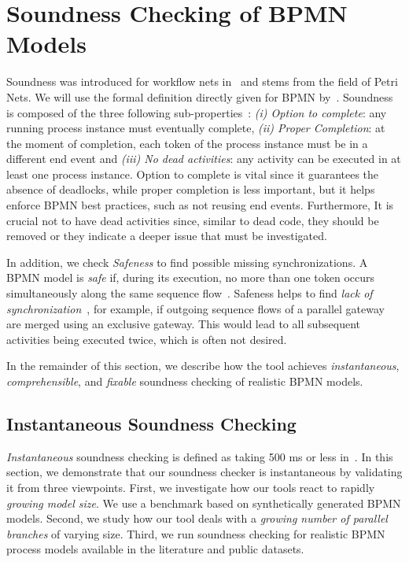 \documentclass[runningheads]{llncs}
\begin{document}
\section{Soundness Checking of BPMN Models} \label{sec:soundness}

Soundness was introduced for workflow nets in~\cite{vanderaalstApplicationPetriNets1998} and stems from the field of Petri Nets.
We will use the formal definition directly given for BPMN by~\cite{corradiniClassificationBPMNCollaborations2018}.
Soundness is composed of the three following sub-properties~\cite{corradiniClassificationBPMNCollaborations2018}:
\textit{(i) Option to complete}: any running process instance must eventually complete,
\textit{(ii) Proper Completion}: at the moment of completion, each token of the process instance must be in a different end event and
\textit{(iii) No dead activities}: any activity can be executed in at least one process instance.
Option to complete is vital since it guarantees the absence of deadlocks, while proper completion is less important, but it helps enforce BPMN best practices, such as not reusing end events.
Furthermore, It is crucial not to have dead activities since, similar to dead code, they should be removed or they indicate a deeper issue that must be investigated.

In addition, we check \textit{Safeness} to find possible missing synchronizations.
A BPMN model is \textit{safe} if, during its execution, no more than one token occurs simultaneously along the same sequence flow~\cite{corradiniClassificationBPMNCollaborations2018}.
Safeness helps to find \textit{lack of synchronization}~\cite{fahlandAnalysisDemandInstantaneous2011}, for example, if outgoing sequence flows of a parallel gateway are merged using an exclusive gateway.
This would lead to all subsequent activities being executed twice, which is often not desired.

In the remainder of this section, we describe how the tool achieves \textit{instantaneous}, \textit{comprehensible}, and \textit{fixable} soundness checking of realistic BPMN models.


\subsection{Instantaneous Soundness Checking} \label{subsec:instantaneous}
\textit{Instantaneous} soundness checking is defined as taking 500 ms or less in~\cite{fahlandAnalysisDemandInstantaneous2011}.
In this section, we demonstrate that our soundness checker is instantaneous by validating it from three viewpoints.
First, we investigate how our tools react to rapidly \textit{growing model size}.
We use a benchmark based on synthetically generated BPMN models.
Second, we study how our tool deals with a \textit{growing number of parallel branches} of varying size.
Third, we run soundness checking for realistic BPMN process models available in the literature and public datasets.
\end{document}
